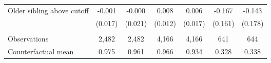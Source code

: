 {{\begin{tabular}{lcccccc}
Older sibling above cutoff&      -0.001   &      -0.000   &       0.008   &       0.006   &      -0.167   &      -0.143   \\
                    &     (0.017)   &     (0.021)   &     (0.012)   &     (0.017)   &     (0.161)   &     (0.178)   \\
                    &               &               &               &               &               &               \\
Observations        &       2,482   &       2,482   &       4,166   &       4,166   &         641   &         644   \\
Counterfactual mean &       0.975   &       0.961   &       0.966   &       0.934   &       0.328   &       0.338   \\
 

\bottomrule
\end{tabular}
}
}
